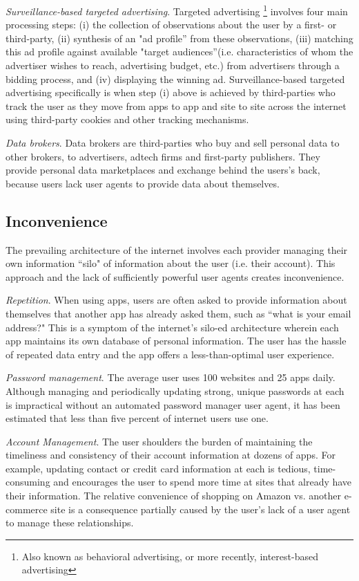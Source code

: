 \documentclass[11pt, oneside]{article}   	%
\begin{document}
\emph{Surveillance-based targeted advertising}. Targeted advertising \footnote{Also known as behavioral advertising, or more recently, interest-based advertising} involves four main processing steps: (i) the collection of observations about the user by a first- or third-party, (ii) synthesis of an "ad profile” from these observations, (iii) matching this ad profile against available "target audiences”(i.e. characteristics of whom the advertiser wishes to reach, advertising budget, etc.) from advertisers through a bidding process, and (iv) displaying the winning ad. Surveillance-based targeted advertising specifically is when step (i) above is achieved by third-parties who track the user as they move from apps to app and site to site across the internet using third-party cookies and other tracking mechanisms. 

\emph{Data brokers}. Data brokers are third-parties who buy and sell personal data to other brokers, to advertisers, adtech firms and first-party publishers. They provide  personal data marketplaces and exchange behind the users's back, because users lack user agents to provide data about themselves.


\subsection{Inconvenience}
The prevailing architecture of the internet involves each provider managing their own  information ``silo" of information about the user (i.e. their account). This approach and the lack of sufficiently powerful user agents creates inconvenience.

\emph{Repetition}. When using apps, users are often asked to provide information about themselves that another app has already asked them, such as ``what is your email address?" This is a symptom of the internet's silo-ed architecture wherein each app maintains its own database of personal information. The user has the hassle of repeated data entry and the app offers a less-than-optimal user experience.

\emph{Password management}. The average user uses 100 websites and 25 apps daily. Although managing and periodically updating strong, unique passwords at each is  impractical without an automated password manager user agent, it has been estimated that less than five percent of internet users use one. 

\emph{Account Management}. The user shoulders the burden of maintaining the timeliness and consistency of their account information at dozens of apps. For example, updating contact or credit card information at each is tedious, time-consuming and encourages the user to spend more time at sites that already have their information. The relative convenience of shopping on Amazon vs. another e-commerce site is a consequence partially caused by the user's lack of a user agent to manage these relationships.
\end{document}
